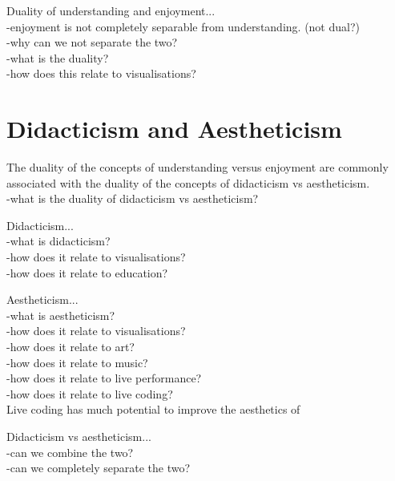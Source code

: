 Duality of understanding and enjoyment...\\
-enjoyment is not completely separable from understanding. (not dual?)\\
-why can we not separate the two?\\
-what is the duality?\\
-how does this relate to visualisations?


\section{Didacticism and Aestheticism}

The duality of the concepts of understanding versus enjoyment are commonly associated with the duality of the concepts of didacticism vs aestheticism.\\
-what is the duality of didacticism vs aestheticism?

Didacticism...\\
-what is didacticism?\\
-how does it relate to visualisations?\\
-how does it relate to education?

Aestheticism...\\
-what is aestheticism?\\
-how does it relate to visualisations?\\
-how does it relate to art?\\
-how does it relate to music?\\
-how does it relate to live performance?\\
-how does it relate to live coding? \cite{Bell}\\
Live coding has much potential to improve the aesthetics of 

Didacticism vs aestheticism...\\
-can we combine the two?\\
-can we completely separate the two?

